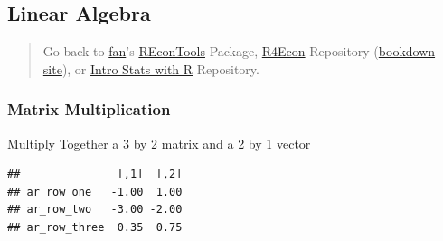 \documentclass[
]{book}
\newenvironment{Shaded}{\begin{snugshade}}{\end{snugshade}}
\newcommand{\CommentTok}[1]{\textcolor[rgb]{0.56,0.35,0.01}{\textit{#1}}}
\newcommand{\DecValTok}[1]{\textcolor[rgb]{0.00,0.00,0.81}{#1}}
\newcommand{\FloatTok}[1]{\textcolor[rgb]{0.00,0.00,0.81}{#1}}
\newcommand{\KeywordTok}[1]{\textcolor[rgb]{0.13,0.29,0.53}{\textbf{#1}}}
\newcommand{\NormalTok}[1]{#1}
\newcommand{\OperatorTok}[1]{\textcolor[rgb]{0.81,0.36,0.00}{\textbf{#1}}}
\newcommand{\StringTok}[1]{\textcolor[rgb]{0.31,0.60,0.02}{#1}}
\begin{document}
\hypertarget{linear-algebra}{%
\subsection{Linear Algebra}\label{linear-algebra}}

\begin{quote}
Go back to \href{http://fanwangecon.github.io/}{fan}'s \href{https://fanwangecon.github.io/REconTools/}{REconTools} Package, \href{https://fanwangecon.github.io/R4Econ/}{R4Econ} Repository (\href{https://fanwangecon.github.io/R4Econ/bookdown}{bookdown site}), or \href{https://fanwangecon.github.io/Stat4Econ/}{Intro Stats with R} Repository.
\end{quote}

\hypertarget{matrix-multiplication}{%
\subsubsection{Matrix Multiplication}\label{matrix-multiplication}}

Multiply Together a 3 by 2 matrix and a 2 by 1 vector

\begin{Shaded}
\end{Shaded}

\begin{verbatim}
##               [,1]  [,2]
## ar_row_one   -1.00  1.00
## ar_row_two   -3.00 -2.00
## ar_row_three  0.35  0.75
\end{verbatim}
\end{document}
